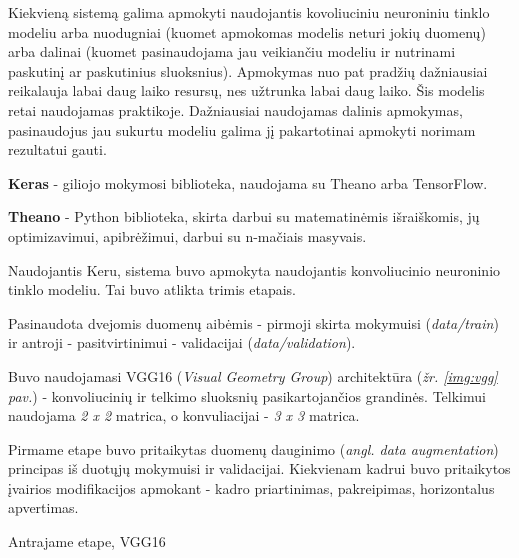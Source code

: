 \documentclass{VUMIFInfKursinis}
\begin{document}
Kiekvieną sistemą galima apmokyti naudojantis kovoliuciniu neuroniniu tinklo modeliu arba nuodugniai (kuomet apmokomas modelis neturi jokių duomenų) arba dalinai (kuomet pasinaudojama jau veikiančiu modeliu ir nutrinami paskutinį ar paskutinius sluoksnius). Apmokymas nuo pat pradžių dažniausiai reikalauja labai daug laiko resursų, nes užtrunka labai daug laiko. Šis modelis retai naudojamas praktikoje. Dažniausiai naudojamas dalinis apmokymas, pasinaudojus jau sukurtu modeliu galima jį pakartotinai apmokyti norimam rezultatui gauti.

\textbf{Keras} - giliojo mokymosi biblioteka, naudojama su Theano arba TensorFlow.

\textbf{Theano} - Python biblioteka, skirta darbui su matematinėmis išraiškomis, jų optimizavimui, apibrėžimui, darbui su n-mačiais masyvais.


Naudojantis Keru, sistema buvo apmokyta naudojantis konvoliucinio neuroninio tinklo modeliu. Tai buvo atlikta trimis etapais.

Pasinaudota dvejomis duomenų aibėmis - pirmoji skirta mokymuisi (\textit{data/train}) ir antroji - pasitvirtinimui - validacijai (\textit{data/validation}).

Buvo naudojamasi VGG16 (\textit{Visual Geometry Group}) architektūra (\textit{žr. \ref{img:vgg} pav.}) - konvoliucinių ir telkimo sluoksnių pasikartojančios grandinės. Telkimui naudojama \textit{2 x 2} matrica, o konvuliacijai - \textit{3 x 3} matrica.

Pirmame etape buvo pritaikytas duomenų dauginimo (\textit{angl. data augmentation}) principas iš duotųjų mokymuisi ir validacijai. Kiekvienam kadrui buvo pritaikytos įvairios modifikacijos apmokant - kadro priartinimas, pakreipimas, horizontalus apvertimas.



Antrajame etape, VGG16 

\end{document}
